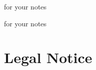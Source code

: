 \newpage
\pagestyle{cropmarksstyle}
\begin{center}
  for your notes
\end{center}

\newpage
\pagestyle{cropmarksstyle}
\begin{center}
  for your notes
\end{center}

\newpage
\pagestyle{citymap}
\null
\newpage
\null

\newpage
\pagestyle{metro}
\label{metromap}
\null

\newpage
\section*{Legal Notice}
\label{legal}
\pagestyle{cropmarksstyle}

\RaggedRight
